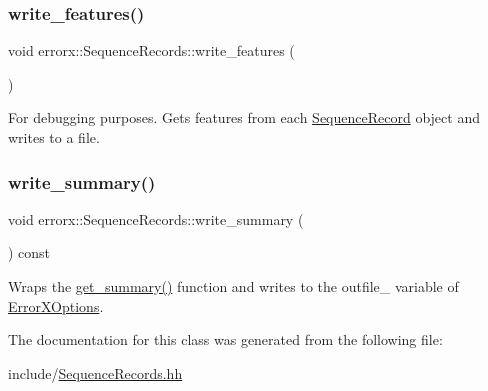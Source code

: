 \subsubsection{\texorpdfstring{write\+\_\+features()}{write\_features()}}
{\footnotesize\ttfamily void errorx\+::\+Sequence\+Records\+::write\+\_\+features (\begin{DoxyParamCaption}{ }\end{DoxyParamCaption})}

For debugging purposes. Gets features from each \mbox{\hyperlink{classerrorx_1_1_sequence_record}{Sequence\+Record}} object and writes to a file. \mbox{\label{classerrorx_1_1_sequence_records_a452c742e8e8b5d2439f2a4de906bd5b7}} 
\subsubsection{\texorpdfstring{write\+\_\+summary()}{write\_summary()}}
{\footnotesize\ttfamily void errorx\+::\+Sequence\+Records\+::write\+\_\+summary (\begin{DoxyParamCaption}{ }\end{DoxyParamCaption}) const}

Wraps the \mbox{\hyperlink{classerrorx_1_1_sequence_records_a426a62dad84bd4fe3a94a955c7b92330}{get\+\_\+summary()}} function and writes to the outfile\+\_\+ variable of \mbox{\hyperlink{classerrorx_1_1_error_x_options}{Error\+X\+Options}}. 

The documentation for this class was generated from the following file\+:\begin{DoxyCompactItemize}
\item 
include/\mbox{\hyperlink{_sequence_records_8hh}{Sequence\+Records.\+hh}}\end{DoxyCompactItemize}
